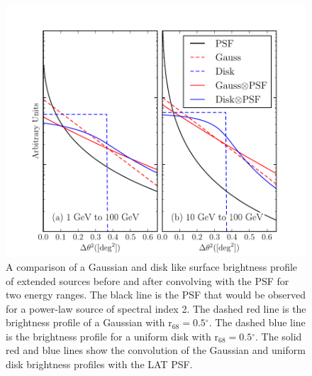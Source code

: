 \documentclass[12pt,preprint]{aastex}
\newcommand{\rsixeight}{{\ensuremath{\text{r}_{68}}}\xspace}
\renewcommand{\deg}{\ensuremath{^\circ}\xspace}
\begin{document}
\clearpage
\begin{figure}
  \begin{center}
    \includegraphics{mc_plots/compare_disk_gauss.pdf}
    \end{center}
    \caption{
    A comparison of a Gaussian and disk like surface brightness profile
    of extended sources before and after convolving with the PSF for two
    energy ranges.  The black line is the PSF that would be observed
    for a power-law source of spectral index 2. The dashed red line
    is the brightness profile of a Gaussian with $\rsixeight=0.5\deg$.
    The dashed blue line is the brightness profile for a uniform disk
    with $\rsixeight=0.5\deg$.  The solid red and blue lines show the
    convolution of the Gaussian and uniform disk brightness profiles
    with the LAT PSF.
    }\label{compare_disk_gauss}
  \end{figure}
\end{document}
